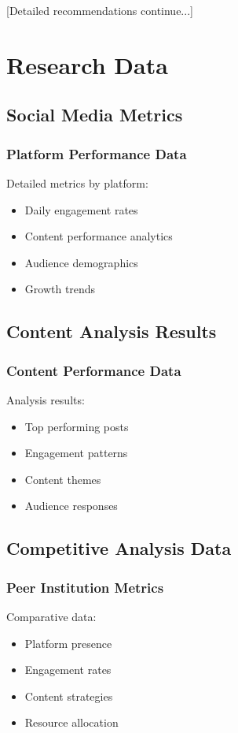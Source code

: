 \documentclass[12pt]{report}
\begin{document}
[Detailed recommendations continue...]

\appendix
\chapter{Research Data}

\section{Social Media Metrics}
\subsection{Platform Performance Data}
Detailed metrics by platform:
\begin{itemize}
    \item Daily engagement rates
    \item Content performance analytics
    \item Audience demographics
    \item Growth trends
\end{itemize}

\section{Content Analysis Results}
\subsection{Content Performance Data}
Analysis results:
\begin{itemize}
    \item Top performing posts
    \item Engagement patterns
    \item Content themes
    \item Audience responses
\end{itemize}

\section{Competitive Analysis Data}
\subsection{Peer Institution Metrics}
Comparative data:
\begin{itemize}
    \item Platform presence
    \item Engagement rates
    \item Content strategies
    \item Resource allocation
\end{itemize}
\end{document}
